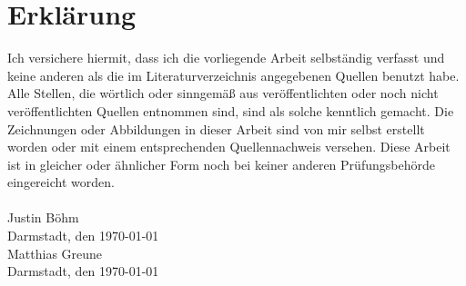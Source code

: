 \chapter{Erklärung}
Ich versichere hiermit, dass ich die vorliegende Arbeit selbständig verfasst und keine anderen als die im Literaturverzeichnis angegebenen Quellen benutzt habe.
Alle Stellen, die wörtlich oder sinngemäß aus veröffentlichten oder noch nicht veröffentlichten Quellen entnommen sind, sind als solche kenntlich gemacht.
Die Zeichnungen oder Abbildungen in dieser Arbeit sind von mir selbst erstellt worden oder mit einem entsprechenden Quellennachweis versehen.
Diese Arbeit ist in gleicher oder ähnlicher Form noch bei keiner anderen
Prüfungsbehörde eingereicht worden.\\\\

Justin Böhm\\
Darmstadt, den \today\\[2cm]

Matthias Greune\\
Darmstadt, den \today\\
